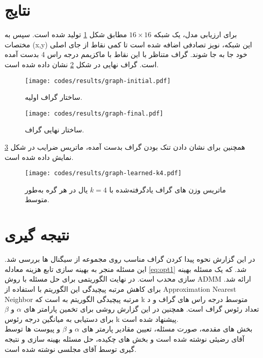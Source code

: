 \documentclass[10pt,twocolumn,a4paper]{article}
\begin{document}
\section{نتایج}
برای ارزیابی مدل، یک شبکه $16\times16$  مطابق شکل \ref{fig:graph-initial-1}  تولید شده است. سپس به مختصات (x,y) این شبکه، نویز تصادفی اضافه شده است تا کمی نقاط از جای اصلی خود جا به جا شوند. گراف متناظر با این نقاط با ماکزیمم درجه راس 4
بدست آمده است. گراف نهایی در شکل
\ref{fig:graph-final-1}
 نشان داده شده است.
	\begin{figure}[H]
	\centering
	\texttt{[image: codes/results/graph-initial.pdf]}
	\caption{ساختار گراف اولیه.}
	\label{fig:graph-initial-1}
	\end{figure}
	
	\begin{figure}[H]
	\centering
	\texttt{[image: codes/results/graph-final.pdf]}
	\caption{ساختار نهایی گراف.}
	\label{fig:graph-final-1}
\end{figure}
 همچنین برای نشان دادن تنک بودن
  گراف بدست آمده، ماتریس ضرایب در شکل
   \ref{fig:graph-learned-k4-1}
   نمایش داده شده است.
  
  \begin{figure}[H]
  	\centering
  	\texttt{[image: codes/results/graph-learned-k4.pdf]}
  	\caption{
  		ماتریس وزن های گراف یادگرفته‌شده با \( k = 4 \) یال در هر گره به‌طور متوسط.
  		}
  	\label{fig:graph-learned-k4-1}
  \end{figure}
  
  \section{نتیجه گیری}
  در این گزارش نحوه پیدا کردن گراف مناسب روی مجموعه از سیگنال ها بررسی شد. این مسئله منجر به بهینه سازی تابع هزینه معادله
  \ref{eq:opt1}
  شد. که یک مسئله بهینه سازی محدب است. در نهایت الگوریتمی برای حل مسئله با روش ADMM ارائه شد. برای کاهش مرتبه پیچیدگی این الگوریتم با استفاده از Approximation Nearest Neighbor مرتبه پیچیدگی الگوریتم به
  است که k متوسط درجه راس های گراف و د تعداد رئوس گراف است. همچنین در این گزارش روشی برای تخمین پارامتر های $\alpha$ و $\beta$ برای دستیابی به میانگین درجه رئوس k پیشنهاد شده است. \\
  
  بخش های مقدمه، صورت مسئله، تعیین مقادیر پارمتر های 
  $\alpha$ و $\beta$
  و پیوست ها توسط آقای رضیئی نوشته شده است و بخش های چکیده، حل مسئله بهینه سازی و نتیجه گیری توسط آقای مجلسی نوشته شده است.\\
  
\end{document}
